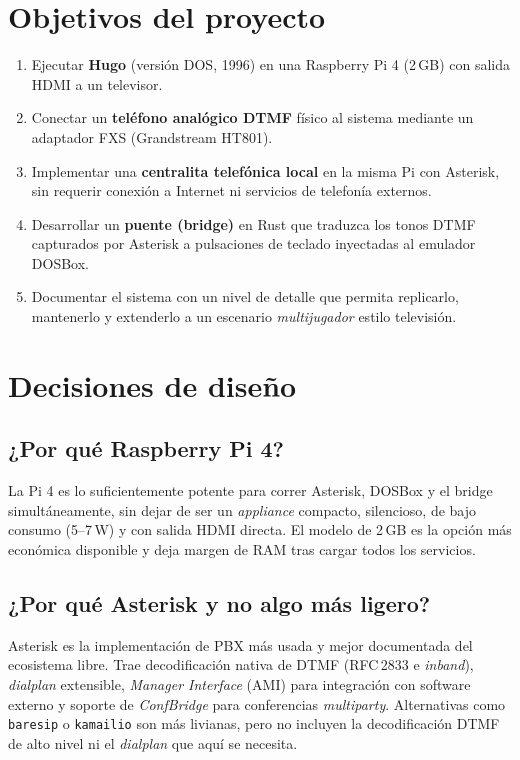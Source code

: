 \section{Objetivos del proyecto}

\begin{enumerate}
  \item Ejecutar \textbf{Hugo} (versión DOS, 1996) en una Raspberry Pi 4 (2\,GB) con salida HDMI a un televisor.
  \item Conectar un \textbf{teléfono analógico DTMF} físico al sistema mediante un adaptador FXS (Grandstream HT801).
  \item Implementar una \textbf{centralita telefónica local} en la misma Pi con Asterisk, sin requerir conexión a Internet ni servicios de telefonía externos.
  \item Desarrollar un \textbf{puente (bridge)} en Rust que traduzca los tonos DTMF capturados por Asterisk a pulsaciones de teclado inyectadas al emulador DOSBox.
  \item Documentar el sistema con un nivel de detalle que permita replicarlo, mantenerlo y extenderlo a un escenario \emph{multijugador} estilo televisión.
\end{enumerate}

\section{Decisiones de diseño}

\subsection{¿Por qué Raspberry Pi 4?}

La Pi 4 es lo suficientemente potente para correr Asterisk, DOSBox y el bridge simultáneamente, sin dejar de ser un \emph{appliance} compacto, silencioso, de bajo consumo (5--7\,W) y con salida HDMI directa. El modelo de 2\,GB es la opción más económica disponible y deja margen de RAM tras cargar todos los servicios.

\subsection{¿Por qué Asterisk y no algo más ligero?}

Asterisk es la implementación de PBX más usada y mejor documentada del ecosistema libre. Trae decodificación nativa de DTMF (RFC\,2833 e \emph{inband}), \emph{dialplan} extensible, \emph{Manager Interface} (AMI) para integración con software externo y soporte de \emph{ConfBridge} para conferencias \emph{multiparty}. Alternativas como \texttt{baresip} o \texttt{kamailio} son más livianas, pero no incluyen la decodificación DTMF de alto nivel ni el \emph{dialplan} que aquí se necesita.

